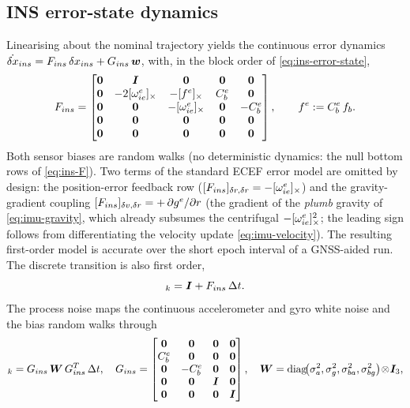 \documentclass[main.tex]{subfiles}
\begin{document}
\subsection{INS error-state dynamics}\label{sec:imu-error}

Linearising  about the
nominal trajectory yields the continuous error dynamics
$\dot{\delta x}_{ins} = F_{ins}\,\delta x_{ins}
+ G_{ins}\,\boldsymbol w$, with, in the block order of
\cref{eq:ins-error-state},
\begin{equation}
F_{ins} =
\begin{bmatrix}
\boldsymbol 0 & \boldsymbol I & \boldsymbol 0 & \boldsymbol 0 & \boldsymbol 0\\
\boldsymbol 0 & -2[\omega_{ie}^e]_\times & -[f^e]_\times & C_b^e & \boldsymbol 0\\
\boldsymbol 0 & \boldsymbol 0 & -[\omega_{ie}^e]_\times & \boldsymbol 0 & -C_b^e\\
\boldsymbol 0 & \boldsymbol 0 & \boldsymbol 0 & \boldsymbol 0 & \boldsymbol 0\\
\boldsymbol 0 & \boldsymbol 0 & \boldsymbol 0 & \boldsymbol 0 & \boldsymbol 0
\end{bmatrix},
\qquad f^e := C_b^e\,f_b .
\label{eq:ins-F}
\end{equation}
Both sensor biases are random walks (no deterministic dynamics: the
null bottom rows of \cref{eq:ins-F}).  Two terms of the standard ECEF
error model are omitted by design: the position-error feedback row
($[F_{ins}]_{\delta r,\delta r} = -[\omega_{ie}^e]_\times$) and the
gravity-gradient coupling
$[F_{ins}]_{\delta v,\delta r} = +\,\partial g^e/\partial r$
(the gradient of the \emph{plumb} gravity of \cref{eq:imu-gravity}, which
already subsumes the centrifugal $-[\omega_{ie}^e]_\times^{2}$; the leading
sign follows from differentiating the velocity update
\cref{eq:imu-velocity}).  The resulting first-order model is accurate
over the short epoch interval of a GNSS-aided run.  The discrete
transition is also first order,
\begin{equation}
[\insPhi]_k = \boldsymbol I + \insF\,\dt .
\label{eq:ins-Phi}
\end{equation}
The process noise maps the continuous accelerometer and gyro white
noise and the bias random walks through
\begin{equation}
[\insQ]_k = \insG\,\boldsymbol W\,\insG^{\Tr}\,\dt, \quad
\insG =
\begin{bmatrix}
\boldsymbol 0 & \boldsymbol 0 & \boldsymbol 0 & \boldsymbol 0\\
\Cbe & \boldsymbol 0 & \boldsymbol 0 & \boldsymbol 0\\
\boldsymbol 0 & -\Cbe & \boldsymbol 0 & \boldsymbol 0\\
\boldsymbol 0 & \boldsymbol 0 & \boldsymbol I & \boldsymbol 0\\
\boldsymbol 0 & \boldsymbol 0 & \boldsymbol 0 & \boldsymbol I
\end{bmatrix}, \quad
\boldsymbol W = \operatorname{diag}\!\bigl(
  \sigma_a^2, \sigma_g^2, \sigma_{ba}^2, \sigma_{bg}^2\bigr)\!\otimes\! \boldsymbol I_3 ,
\label{eq:ins-Q}
\end{equation}
\end{document}
